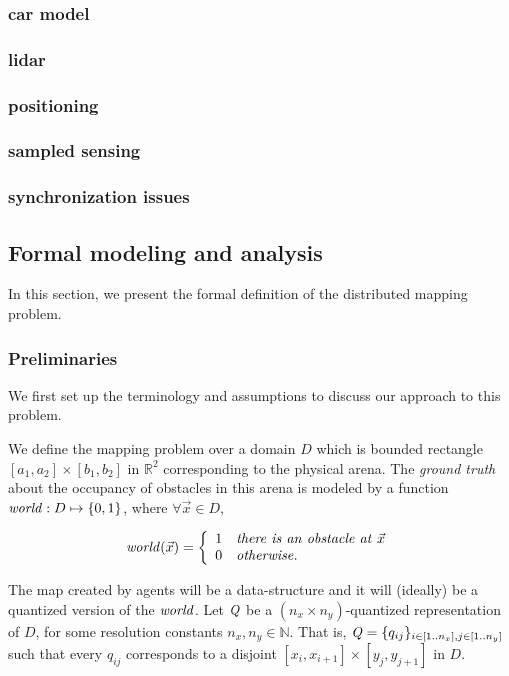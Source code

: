 \subsubsection{car model}
\subsubsection{lidar}
\subsubsection{positioning}
\subsubsection{sampled sensing}
\subsubsection{synchronization issues}

\subsection{Formal modeling and analysis}
\label{sec:formal}

In this section, we present the formal definition of the distributed mapping problem. 

\subsubsection{Preliminaries}
\label{sec:prelims}
We first set up the terminology and assumptions to discuss our approach to this problem.

We define the mapping problem over a domain $D$ which is bounded rectangle $[a_1,a_2]\times [b_1,b_2]$ in $\mathbb{R}^2$ corresponding to the physical arena. 
The \emph{ground truth} about the occupancy of obstacles in this arena is modeled by a function $\mathit{world} : D\mapsto \left\{0,1\right\}$, where $\forall \Vec{x} \in D$, 

\begin{align}
\mathit{world}(\Vec{x}) = 
		\left\{
		\begin{array}{ll}
			1 & \mathit{there \ is\ an\ obstacle\ at}\ \Vec{x}\\
			0 & \mathit{otherwise}.
		\end{array}
		\right.
\end{align}

The map created by agents will be a data-structure and it will (ideally) be a quantized version of the $\mathit{world}$.
Let $\mathit{Q}$ be a $(n_x\times n_y)$-quantized representation of $D$, for some resolution constants $n_x,n_y \in \mathbb{N}$. That is, $\mathit{Q} = \{q_{ij}\}_{i\in [1..n_x], j\in [1..n_y]}$
such that every $q_{ij}$ corresponds to a disjoint $[x_i, x_{i+1}] \times [y_j, y_{j+1}]$ in $D$.

